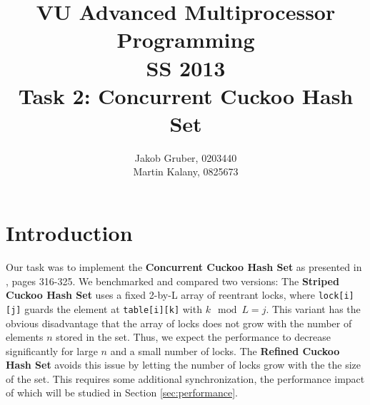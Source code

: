 \documentclass[a4paper,10pt]{article}
\title{VU Advanced Multiprocessor Programming \\
       SS 2013 \\
       Task 2: Concurrent Cuckoo Hash Set}
\author{Jakob Gruber, 0203440 \\
        Martin Kalany, 0825673}
\begin{document}
\maketitle

\begin{comment}
* Good theoretical analysis (invariants, linearizability, progress guarantees).
* Good benchmark analysis.
* Short document: 2-4 pages excluding plots and sourcecode. Description of data
  structure. Theoretical analysis. Benchmark (results, process).

+The Go implementation doesn't need either of these crutches. It's also designed
+to work without reentrant locks and thread ids.
\end{comment}

\section{Introduction}
Our task was to implement the \textbf{Concurrent Cuckoo Hash Set} as presented in \cite{herlihy}, pages 316-325. 
\newline 
We benchmarked and compared two versions: The \textbf{Striped Cuckoo Hash Set} uses a fixed 2-by-L array of reentrant locks, where \lstinline|lock[i][j]| guards the element at \lstinline|table[i][k]| with $k \mod L = j$. This variant has the obvious disadvantage that the array of locks does not grow with the number of elements $n$ stored in the set. Thus, we expect the performance to decrease significantly for large $n$ and a small number of locks.
\newline
The \textbf{Refined Cuckoo Hash Set} avoids this issue by letting the number of locks grow with the the size of the set. This requires some additional synchronization, the performance impact of which will be studied in Section \ref{sec:performance}.
\end{document}
